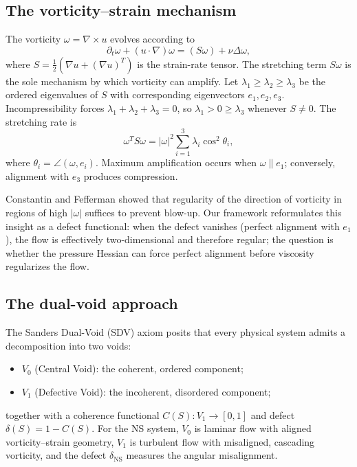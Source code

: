 \documentclass[11pt]{article}
\theoremstyle{definition}
\theoremstyle{remark}
\begin{document}
\subsection{The vorticity--strain mechanism}

The vorticity $\omega = \nabla \times u$ evolves according to
\begin{equation}\label{eq:vorticity}
  \partial_t \omega + (u\cdot\nabla)\omega = (S\omega) + \nu\Delta\omega,
\end{equation}
where $S = \tfrac{1}{2}(\nabla u + (\nabla u)^T)$ is the strain-rate tensor.  The
stretching term $S\omega$ is the sole mechanism by which vorticity can amplify.
Let $\lambda_1 \geq \lambda_2 \geq \lambda_3$ be the ordered eigenvalues of $S$
with corresponding eigenvectors $e_1, e_2, e_3$.  Incompressibility forces
$\lambda_1 + \lambda_2 + \lambda_3 = 0$, so $\lambda_1 > 0 \geq \lambda_3$ whenever
$S \neq 0$.  The stretching rate is
\[
  \omega^T S\omega = |\omega|^2 \sum_{i=1}^3 \lambda_i \cos^2\theta_i,
\]
where $\theta_i = \angle(\omega, e_i)$.  Maximum amplification occurs when
$\omega \| e_1$; conversely, alignment with $e_3$ produces compression.

Constantin and Fefferman \cite{CF} showed that regularity of the direction of
vorticity in regions of high $|\omega|$ suffices to prevent blow-up.  Our framework
reformulates this insight as a defect functional: when the defect vanishes
(perfect alignment with $e_1$), the flow is effectively two-dimensional and therefore
regular; the question is whether the pressure Hessian can force perfect alignment
before viscosity regularizes the flow.

\subsection{The dual-void approach}

The Sanders Dual-Void (SDV) axiom posits that every physical system admits a
decomposition into two voids:
\begin{itemize}[nosep]
  \item $V_0$ (Central Void): the coherent, ordered component;
  \item $V_1$ (Defective Void): the incoherent, disordered component;
\end{itemize}
together with a coherence functional $C(S): V_1 \to [0,1]$ and defect
$\delta(S) = 1 - C(S)$.  For the NS system, $V_0$ is laminar flow with aligned
vorticity--strain geometry, $V_1$ is turbulent flow with misaligned, cascading
vorticity, and the defect $\delta_{\mathrm{NS}}$ measures the angular misalignment.
\end{document}
